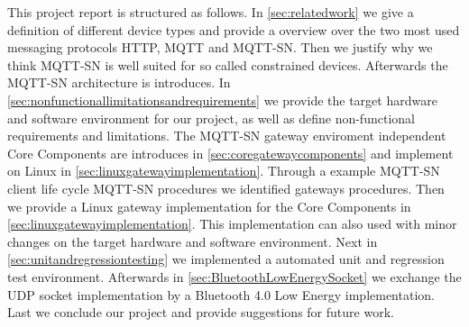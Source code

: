 This project report is structured as follows.
In \autoref{sec:relatedwork} we give a definition of different device types and provide a overview over the two most used messaging protocols HTTP, MQTT and MQTT-SN.
Then we justify why we think MQTT-SN is well suited for so called constrained devices.
Afterwards the MQTT-SN architecture is introduces.
In \autoref{sec:nonfunctionallimitationsandrequirements} we provide the target hardware and software environment for our project, as well as define non-functional requirements and limitations.
The MQTT-SN gateway enviroment independent Core Components are introduces in \autoref{sec:coregatewaycomponents} and implement on Linux in \autoref{sec:linuxgatewayimplementation}. Through a example MQTT-SN client life cycle MQTT-SN procedures we identified gateways procedures.
Then we provide a Linux gateway implementation for the Core Components in \autoref{sec:linuxgatewayimplementation}. This implementation can also used with minor changes on the target hardware and software environment.
Next in \autoref{sec:unitandregressiontesting} we implemented a automated unit and regression test environment.
Afterwards in \autoref{sec:BluetoothLowEnergySocket} we exchange the UDP socket implementation by a Bluetooth 4.0 Low Energy implementation.
Last we conclude our project and provide suggestions for future work.